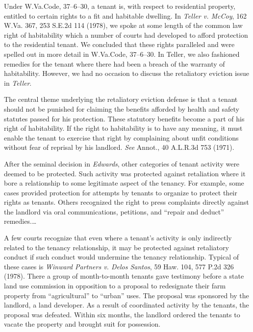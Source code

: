 Under W.Va.Code, 37--6--30, a tenant is, with respect to residential property,
entitled to certain rights to a fit and habitable dwelling. In \textit{Teller
v. McCoy}, 162 W.Va. 367, 253 S.E.2d 114 (1978), we spoke at some length of the
common law right of habitability which a number of courts had developed to
afford protection to the residential tenant. We concluded that these rights
paralleled and were spelled out in more detail in W.Va.Code, 37--6--30. In
Teller, we also fashioned remedies for the tenant where there had been a breach
of the warranty of habitability. However, we had no occasion to discuss the
retaliatory eviction issue in \textit{Teller}.

The central theme underlying the retaliatory eviction defense is that a tenant
should not be punished for claiming the benefits afforded by health and safety
statutes passed for his protection. These statutory benefits become a part of
his right of habitability. If the right to habitability is to have any meaning,
it must enable the tenant to exercise that right by complaining about unfit
conditions without fear of reprisal by his landlord. \textit{See} Annot., 40
A.L.R.3d 753 (1971).

After the seminal decision in \textit{Edwards}, other categories of tenant
activity were deemed to be protected. Such activity was protected against
retaliation where it bore a relationship to some legitimate aspect of the
tenancy. For example, some cases provided protection for attempts by tenants to
organize to protect their rights as tenants. Others recognized the right to
press complaints directly against the landlord via oral communications,
petitions, and ``repair and deduct'' remedies.\ldots

A few courts recognize that even where a tenant's activity is only indirectly
related to the tenancy relationship, it may be protected against retaliatory
conduct if such conduct would undermine the tenancy relationship. Typical of
these cases is \textit{Winward Partners v. Delos Santos}, 59 Haw. 104, 577 P.2d
326 (1978). There a group of month-to-month tenants gave testimony before a
state land use commission in opposition to a proposal to redesignate their farm
property from ``agricultural'' to ``urban'' uses. The proposal was sponsored by
the landlord, a land developer. As a result of coordinated activity by the
tenants, the proposal was defeated. Within six months, the landlord ordered the
tenants to vacate the property and brought suit for possession.

